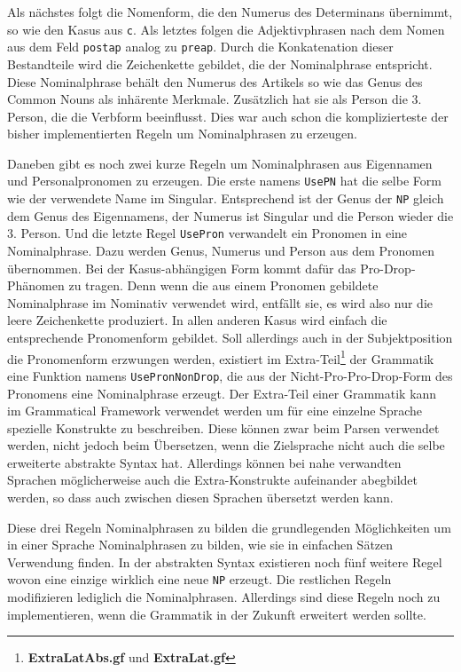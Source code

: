 \documentclass[fontsize=12pt,abstract=on,titlepage,bibliography=totoc,ngerman,listof=totoc]{scrreprt}
\begin{document}
Als nächstes folgt die Nomenform, die den Numerus des Determinans übernimmt, so wie den Kasus aus \texttt{c}. Als letztes folgen die Adjektivphrasen nach dem Nomen aus dem Feld \texttt{postap} analog zu \texttt{preap}. Durch die Konkatenation dieser Bestandteile wird die Zeichenkette gebildet, die der Nominalphrase entspricht. Diese Nominalphrase behält den Numerus des Artikels so wie das Genus des Common Nouns als inhärente Merkmale. Zusätzlich hat sie als Person die 3. Person, die die Verbform beeinflusst. Dies war auch schon die komplizierteste der bisher implementierten Regeln um Nominalphrasen zu erzeugen. \par
Daneben gibt es noch zwei kurze Regeln um Nominalphrasen aus Eigennamen und Personalpronomen zu erzeugen. Die erste namens \texttt{UsePN} hat die selbe Form wie der verwendete Name im Singular. Entsprechend ist der Genus der \texttt{NP} gleich dem Genus des Eigennamens, der Numerus ist Singular und die Person wieder die 3. Person. Und die letzte Regel \texttt{UsePron} verwandelt ein Pronomen in eine Nominalphrase. Dazu werden Genus, Numerus und Person aus dem Pronomen übernommen. Bei der Kasus-abhängigen Form kommt dafür das Pro-Drop-Phänomen zu tragen. Denn wenn die aus einem Pronomen gebildete Nominalphrase im Nominativ verwendet wird, entfällt sie, es wird also nur die leere Zeichenkette produziert. In allen anderen Kasus wird einfach die entsprechende Pronomenform gebildet. 
Soll allerdings auch in der Subjektposition die Pronomenform erzwungen werden, existiert im Extra-Teil\footnote{\textbf{ExtraLatAbs.gf} und \textbf{ExtraLat.gf}} der Grammatik eine Funktion namens \texttt{UsePronNonDrop}, die aus der Nicht-Pro-Pro-Drop-Form des Pronomens eine Nominalphrase erzeugt. Der Extra-Teil einer Grammatik kann im Grammatical Framework verwendet werden um für eine einzelne Sprache spezielle Konstrukte zu beschreiben. Diese können zwar beim Parsen verwendet werden, nicht jedoch beim Übersetzen, wenn die Zielsprache nicht auch die selbe erweiterte abstrakte Syntax hat. Allerdings können bei nahe verwandten Sprachen möglicherweise auch die Extra-Konstrukte aufeinander abegbildet werden, so dass auch zwischen diesen Sprachen übersetzt werden kann.\par
Diese drei Regeln Nominalphrasen zu bilden die grundlegenden Möglichkeiten um in einer Sprache Nominalphrasen zu bilden, wie sie in einfachen Sätzen Verwendung finden. In der abstrakten Syntax existieren noch fünf weitere Regel wovon eine einzige wirklich eine neue \texttt{NP} erzeugt. Die restlichen Regeln modifizieren lediglich die Nominalphrasen. Allerdings sind diese Regeln noch zu implementieren, wenn die Grammatik in der Zukunft erweitert werden sollte.
\end{document}

